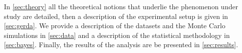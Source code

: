 	In \cref{sec:theory} all the theoretical notions that underlie the phenomenon under study are detailed, then a description of the {\gerda} experimental setup is given in \cref{sec:gerda}. We provide a description of the datasets and the Monte Carlo simulations in \cref{sec:data} and a description of the statistical methodology in \cref{sec:bayes}. Finally, the results of the analysis are be presented in \cref{sec:results}.
